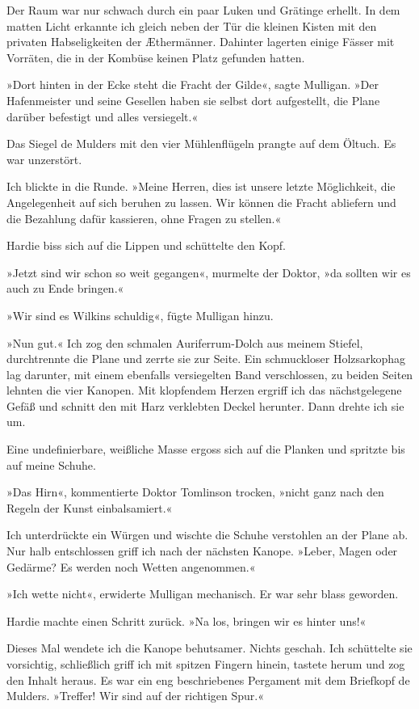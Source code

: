Der Raum war nur schwach durch ein paar Luken und Grätinge erhellt.
In dem matten Licht erkannte ich gleich neben der Tür die kleinen
Kisten mit den privaten Habseligkeiten der Æthermänner. Dahinter
lagerten einige Fässer mit Vorräten, die in der Kombüse keinen
Platz gefunden hatten.

\bigpar

»Dort hinten in der Ecke steht die Fracht der Gilde«, sagte
Mulligan. »Der Hafenmeister und seine Gesellen haben sie selbst
dort aufgestellt, die Plane darüber befestigt und alles
versiegelt.«

Das Siegel de Mulders mit den vier Mühlenflügeln prangte auf dem
Öltuch. Es war unzerstört.

Ich blickte in die Runde. »Meine Herren, dies ist unsere letzte
Möglichkeit, die Angelegenheit auf sich beruhen zu lassen. Wir
können die Fracht abliefern und die Bezahlung dafür kassieren, ohne
Fragen zu stellen.«

Hardie biss sich auf die Lippen und schüttelte den Kopf.

»Jetzt sind wir schon so weit gegangen«, murmelte der Doktor, »da
sollten wir es auch zu Ende bringen.«

»Wir sind es Wilkins schuldig«, fügte Mulligan hinzu.

»Nun gut.« Ich zog den schmalen Auriferrum-Dolch aus meinem
Stiefel, durchtrennte die Plane und zerrte sie zur Seite. Ein
schmuckloser Holzsarkophag lag darunter, mit einem ebenfalls
versiegelten Band verschlossen, zu beiden Seiten lehnten die vier
Kanopen. Mit klopfendem Herzen ergriff ich das nächstgelegene Gefäß
und schnitt den mit Harz verklebten Deckel herunter. Dann drehte
ich sie um.

Eine undefinierbare, weißliche Masse ergoss sich auf die Planken
und spritzte bis auf meine Schuhe.

»Das Hirn«, kommentierte Doktor Tomlinson trocken, »nicht ganz nach
den Regeln der Kunst einbalsamiert.«

Ich unterdrückte ein Würgen und wischte die Schuhe verstohlen an
der Plane ab. Nur halb entschlossen griff ich nach der nächsten
Kanope. »Leber, Magen oder Gedärme? Es werden noch Wetten
angenommen.«

»Ich wette nicht«, erwiderte Mulligan mechanisch. Er war sehr blass
geworden.

Hardie machte einen Schritt zurück. »Na los, bringen wir es hinter
uns!«

Dieses Mal wendete ich die Kanope behutsamer. Nichts geschah. Ich
schüttelte sie vorsichtig, schließlich griff ich mit spitzen
Fingern hinein, tastete herum und zog den Inhalt heraus. Es war ein
eng beschriebenes Pergament mit dem Briefkopf de Mulders. »Treffer!
Wir sind auf der richtigen Spur.«

